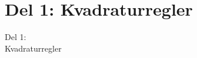 \section{Del 1: Kvadraturregler}
\begin{frame}
\centering
\Huge
Del 1: \\
Kvadraturregler
\end{frame}
%



